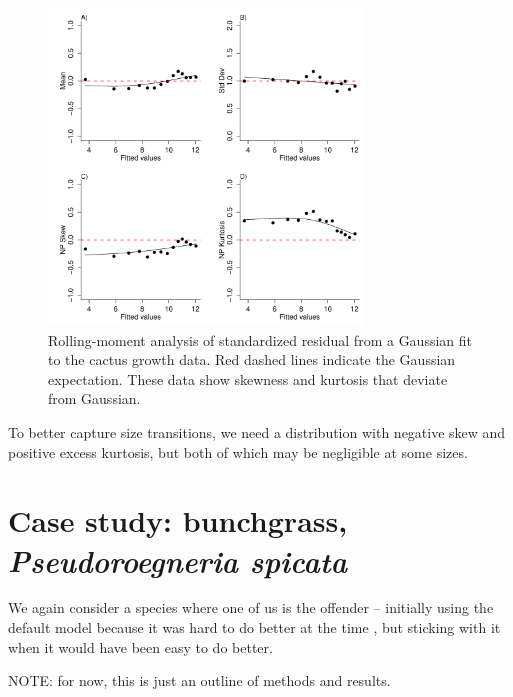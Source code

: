 \documentclass[11pt]{article}
\begin{document}
{\begin{figure}
\centering
\includegraphics[width=0.75\textwidth]{figures/cactus_rolling_moments}
\caption{Rolling-moment analysis of standardized residual from a Gaussian fit to the cactus growth data. Red dashed lines indicate the Gaussian expectation. These data show skewness and kurtosis that deviate from Gaussian.}
\label{fig:cactus_rolling_moments}
\end{figure} 

To better capture size transitions, we need a distribution with negative skew and positive excess kurtosis, but both of which may be negligible at some sizes. 





 
 
\clearpage   

\section{Case study: bunchgrass, \emph{Pseudoroegneria spicata}}

We again consider a species where one of us is the offender -- initially using the default model because 
it was hard to do better at the time \citep{adler-etal-2010}, but sticking with it 
\citep[e.g.,][]{Tredennick2018, Adler-2018} when it would have been easy to do better.   

NOTE: for now, this is just an outline of methods and results. 

}
\end{document}
